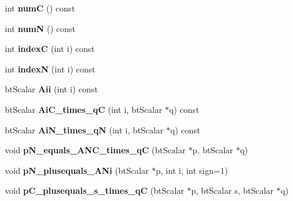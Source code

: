 \begin{DoxyCompactItemize}
\item 
\hypertarget{structbt_l_c_p_af51d7c942ae601672cac52facd51865f}{int {\bfseries num\+C} () const }\label{structbt_l_c_p_af51d7c942ae601672cac52facd51865f}

\item 
\hypertarget{structbt_l_c_p_a70b78d380ff008255f6ddf29c1391af7}{int {\bfseries num\+N} () const }\label{structbt_l_c_p_a70b78d380ff008255f6ddf29c1391af7}

\item 
\hypertarget{structbt_l_c_p_a3381cc222e23614757348356da794f05}{int {\bfseries index\+C} (int i) const }\label{structbt_l_c_p_a3381cc222e23614757348356da794f05}

\item 
\hypertarget{structbt_l_c_p_a82cfa3dba955a255ad75afec6bbadc62}{int {\bfseries index\+N} (int i) const }\label{structbt_l_c_p_a82cfa3dba955a255ad75afec6bbadc62}

\item 
\hypertarget{structbt_l_c_p_a9e0a7153d0b33e6ebd3641a9fddbdc28}{bt\+Scalar {\bfseries Aii} (int i) const }\label{structbt_l_c_p_a9e0a7153d0b33e6ebd3641a9fddbdc28}

\item 
\hypertarget{structbt_l_c_p_a574ba9bebba9d5a3e5809e23c71a03b1}{bt\+Scalar {\bfseries Ai\+C\+\_\+times\+\_\+q\+C} (int i, bt\+Scalar $\ast$q) const }\label{structbt_l_c_p_a574ba9bebba9d5a3e5809e23c71a03b1}

\item 
\hypertarget{structbt_l_c_p_a1feb469acddfc7f2c508839c708f2e4a}{bt\+Scalar {\bfseries Ai\+N\+\_\+times\+\_\+q\+N} (int i, bt\+Scalar $\ast$q) const }\label{structbt_l_c_p_a1feb469acddfc7f2c508839c708f2e4a}

\item 
\hypertarget{structbt_l_c_p_a1b5944789b52cd4d96ef8aff9931ed53}{void {\bfseries p\+N\+\_\+equals\+\_\+\+A\+N\+C\+\_\+times\+\_\+q\+C} (bt\+Scalar $\ast$p, bt\+Scalar $\ast$q)}\label{structbt_l_c_p_a1b5944789b52cd4d96ef8aff9931ed53}

\item 
\hypertarget{structbt_l_c_p_ab1a1253987c80210d7365f62269b05d4}{void {\bfseries p\+N\+\_\+plusequals\+\_\+\+A\+Ni} (bt\+Scalar $\ast$p, int i, int sign=1)}\label{structbt_l_c_p_ab1a1253987c80210d7365f62269b05d4}

\item 
\hypertarget{structbt_l_c_p_aaf8c495c5bae7d5ec7cbbdb1cd4e17a5}{void {\bfseries p\+C\+\_\+plusequals\+\_\+s\+\_\+times\+\_\+q\+C} (bt\+Scalar $\ast$p, bt\+Scalar s, bt\+Scalar $\ast$q)}\label{structbt_l_c_p_aaf8c495c5bae7d5ec7cbbdb1cd4e17a5}


\end{DoxyCompactItemize}
